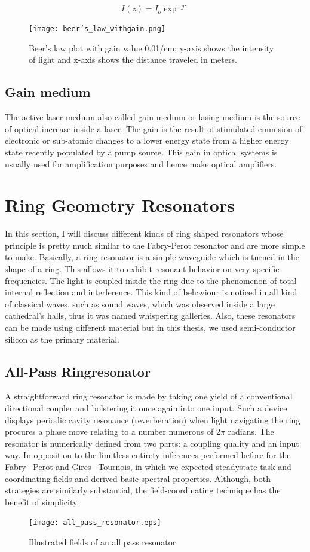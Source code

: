 \begin{equation}
I(z) = I_{o}\exp^{ +g z}
\end{equation}

\begin{figure}[h]
\centering
\texttt{[image: beer's\_law\_withgain.png]}
\caption{Beer's law plot with gain value 0.01/cm: y-axis shows the intensity of light and x-axis shows the distance traveled in meters.}
\end{figure}

\subsection{Gain medium}
The active laser medium also called gain medium or lasing medium is the source of optical increase inside a laser. The gain is the result of stimulated emmision of electronic or sub-atomic changes to a lower energy state from a higher energy state recently populated by a pump source. This gain in optical systems is usually used for amplification purposes and hence make optical amplifiers.


\section{Ring Geometry Resonators}
In this section, I will discuss different kinds of ring shaped resonators whose principle is pretty much similar to the Fabry-Perot resonator and are more simple to make. Basically, a ring resonator is a simple waveguide which is turned in the shape of a ring. This allows it to exhibit resonant behavior on very specific frequencies. The light is coupled inside the ring due to the phenomenon of total internal reflection and interference. This kind of behaviour is noticed in all kind of classical waves, such as sound waves, which was observed inside a large cathedral's halls, thus it was named whispering galleries. Also, these resonators can be made using different material but in this thesis, we used semi-conductor silicon as the primary material. 

\subsection{All-Pass Ringresonator}
A straightforward ring resonator is made by taking one yield of a conventional directional coupler and bolstering it once again into one input. Such a device displays periodic cavity resonance (reverberation) when light navigating the ring procures a phase move relating to a number numerous of 2$\pi$ radians. The resonator is numerically defined from two parts: a coupling quality and an input way. In opposition to the limitless entirety inferences performed before for the Fabry– Perot and Gires– Tournois, in which we expected steadystate task and coordinating fields and derived basic spectral properties. Although, both strategies are similarly substantial, the field-coordinating technique has the benefit of simplicity.
\begin{figure}[h]
\centering
\texttt{[image: all\_pass\_resonator.eps]}
\caption{Illustrated fields of an all pass resonator}
\end{figure}


